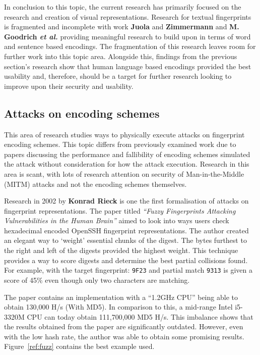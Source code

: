 In conclusion to this topic, the current research has primarily focused on the research and creation of visual representations. Research for textual fingerprints is fragmented and incomplete with work \textbf{Juola} and \textbf{Zimmermann} 
\cite{juola1996whole} and \textbf{M. Goodrich \textit{et al.}}\cite{goodrich2006loud} providing meaningful research to build upon in terms of word and sentence based encodings. The fragmentation of this research leaves room for further work into this topic area. Alongside this, findings from the previous section's research show that human language based encodings provided the best usability and, therefore, should be a target for further research looking to improve upon their security and usability.

\subsection{Attacks on encoding schemes}
This area of research studies ways to physically execute attacks on fingerprint encoding schemes. This topic differs from previously examined work due to papers discussing the performance and fallibility of encoding schemes simulated the attack without consideration for how the attack execution. Research in this area is scant, with lots of research attention on security of Man-in-the-Middle (MITM) attacks and not the encoding schemes themselves.

Research in 2002 by \textbf{Konrad Rieck}\cite{rieck2002fuzzy} is one the first formalisation of attacks on fingerprint representations. The paper titled \textit{``Fuzzy Fingerprints Attacking Vulnerabilities in the Human Brain''} aimed to look into ways users check hexadecimal encoded OpenSSH fingerprint representations. The author created an elegant way to `weight' essential chunks of the digest. The bytes furthest to the right and left of the digests provided the highest weight. This technique provides a way to score digests and determine the best partial collisions found. For example, with the target fingerprint: \verb|9F23| and partial match \verb|9313| is given a score of 45\% even though only two characters are matching.

The paper contains an implementation with a ``1.2GHz CPU'' being able to obtain 130,000 H/s (With MD5). In comparison to this, a mid-range Intel i5-3320M CPU can today obtain 111,700,000 MD5 H/s. This imbalance shows that the results obtained from the paper are significantly outdated. However, even with the low hash rate, the author was able to obtain some promising results. Figure~\ref{ref:fuzz} contains the best example used.


